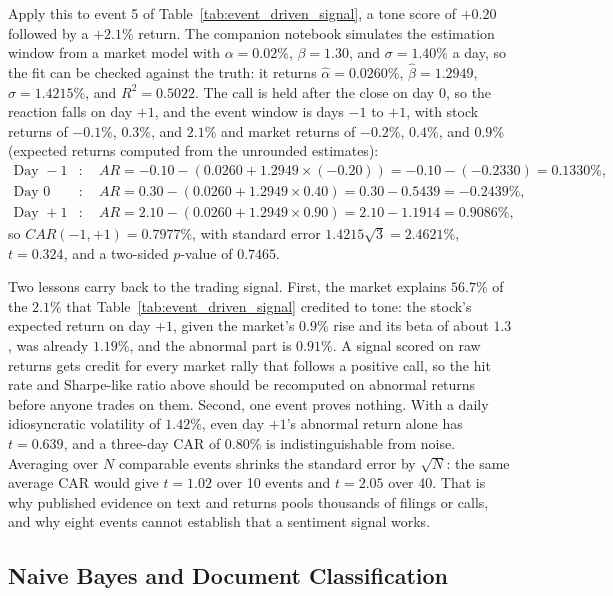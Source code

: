 \documentclass[../ai_in_finance]{subfiles}
\begin{document}
Apply this to event 5 of Table~\ref{tab:event_driven_signal}, a tone score of $+0.20$ followed by a $+2.1\%$ return. The companion notebook simulates the estimation window from a market model with $\alpha = 0.02\%$, $\beta = 1.30$, and $\sigma = 1.40\%$ a day, so the fit can be checked against the truth: it returns $\hat\alpha = 0.0260\%$, $\hat\beta = 1.2949$, $\hat\sigma = 1.4215\%$, and $R^2 = 0.5022$. The call is held after the close on day 0, so the reaction falls on day $+1$, and the event window is days $-1$ to $+1$, with stock returns of $-0.1\%$, $0.3\%$, and $2.1\%$ and market returns of $-0.2\%$, $0.4\%$, and $0.9\%$ (expected returns computed from the unrounded estimates):
\begin{align*}
\text{Day } -1&: \quad AR = -0.10 - (0.0260 + 1.2949 \times (-0.20)) = -0.10 - (-0.2330) = 0.1330\%, \\
\text{Day } 0&: \quad AR = 0.30 - (0.0260 + 1.2949 \times 0.40) = 0.30 - 0.5439 = -0.2439\%, \\
\text{Day } +1&: \quad AR = 2.10 - (0.0260 + 1.2949 \times 0.90) = 2.10 - 1.1914 = 0.9086\%,
\end{align*}
so $CAR(-1,+1) = 0.7977\%$, with standard error $1.4215\sqrt{3} = 2.4621\%$, $t = 0.324$, and a two-sided $p$-value of $0.7465$.

Two lessons carry back to the trading signal. First, the market explains $56.7\%$ of the $2.1\%$ that Table~\ref{tab:event_driven_signal} credited to tone: the stock's expected return on day $+1$, given the market's $0.9\%$ rise and its beta of about $1.3$, was already $1.19\%$, and the abnormal part is $0.91\%$. A signal scored on raw returns gets credit for every market rally that follows a positive call, so the hit rate and Sharpe-like ratio above should be recomputed on abnormal returns before anyone trades on them. Second, one event proves nothing. With a daily idiosyncratic volatility of $1.42\%$, even day $+1$'s abnormal return alone has $t = 0.639$, and a three-day CAR of $0.80\%$ is indistinguishable from noise. Averaging over $N$ comparable events shrinks the standard error by $\sqrt{N}$: the same average CAR would give $t = 1.02$ over 10 events and $t = 2.05$ over 40. That is why published evidence on text and returns pools thousands of filings or calls, and why eight events cannot establish that a sentiment signal works.

\subsection{Naive Bayes and Document Classification}
\label{sec:naive-bayes-text}
\end{document}
